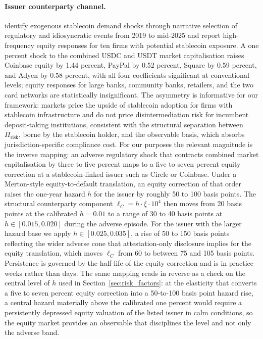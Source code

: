 \paragraph{Issuer counterparty channel.} \citet{cerutti_firat_hengge_sagawa_2026} identify exogenous stablecoin demand shocks through narrative selection of regulatory and idiosyncratic events from 2019 to mid-2025 and report high-frequency equity responses for ten firms with potential stablecoin exposure. A one percent shock to the combined USDC and USDT market capitalisation raises Coinbase equity by 1.44 percent, PayPal by 0.52 percent, Square by 0.59 percent, and Adyen by 0.58 percent, with all four coefficients significant at conventional levels; equity responses for large banks, community banks, retailers, and the two card networks are statistically insignificant. The asymmetry is informative for our framework: markets price the upside of stablecoin adoption for firms with stablecoin infrastructure and do not price disintermediation risk for incumbent deposit-taking institutions, consistent with the structural separation between $\Pi_{\text{risk}}$, borne by the stablecoin holder, and the observable basis, which absorbs jurisdiction-specific compliance cost. For our purposes the relevant magnitude is the inverse mapping: an adverse regulatory shock that contracts combined market capitalisation by three to five percent maps to a five to seven percent equity correction at a stablecoin-linked issuer such as Circle or Coinbase. Under a Merton-style equity-to-default translation, an equity correction of that order raises the one-year hazard $h$ for the issuer by roughly 50 to 100 basis points. The structural counterparty component $\ell_C = h \cdot \xi \cdot 10^4$ then moves from 20 basis points at the calibrated $h = 0.01$ to a range of 30 to 40 basis points at $h \in [0.015, 0.020]$ during the adverse episode. For the issuer with the larger hazard base we apply $h \in [0.025, 0.035]$, a rise of 50 to 150 basis points reflecting the wider adverse cone that attestation-only disclosure implies for the equity translation, which moves $\ell_C$ from 60 to between 75 and 105 basis points. Persistence is governed by the half-life of the equity correction and is in practice weeks rather than days. The same mapping reads in reverse as a check on the central level of $h$ used in Section~\ref{sec:risk_factors}: at the elasticity that converts a five to seven percent equity correction into a 50-to-100 basis point hazard rise, a central hazard materially above the calibrated one percent would require a persistently depressed equity valuation of the listed issuer in calm conditions, so the equity market provides an observable that disciplines the level and not only the adverse band.

